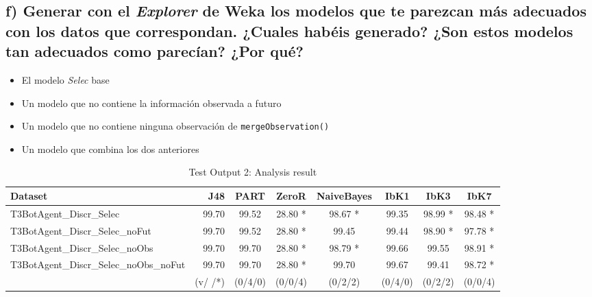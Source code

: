 \documentclass[10pt, spanish, pdftex]{../.memo/plantilla_memorias}
\begin{document}
\subsection{f) Generar con el \textit{Explorer} de Weka los modelos que te parezcan más adecuados con los datos que
correspondan. ¿Cuales habéis generado? ¿Son estos modelos tan adecuados como parecían? ¿Por qué?}
\begin{itemize}
	\item El modelo \textit{Selec} base
	\item Un modelo que no contiene la información observada a futuro
	\item Un modelo que no contiene ninguna observación de \texttt{mergeObservation()}
	\item Un modelo que combina los dos anteriores
\end{itemize}
\begin{table}[h]
	\centering
	\begin{tabular}{l|r|cccccc|}
	\hline
	\multicolumn{1}{|l|}{Dataset}                                & J48     & PART    & ZeroR   & NaiveBayes & IbK1    & IbK3    & IbK7    \\ \hline
	\multicolumn{1}{|l|}{T3BotAgent\_Discr\_Selec}               & 99.70   & 99.52   & 28.80 * & 98.67 *    & 99.35   & 98.99 * & 98.48 * \\
	\multicolumn{1}{|l|}{T3BotAgent\_Discr\_Selec\_noFut}        & 99.70   & 99.52   & 28.80 * & 99.45      & 99.44   & 98.90 * & 97.78 * \\
	\multicolumn{1}{|l|}{T3BotAgent\_Discr\_Selec\_noObs}        & 99.70   & 99.70   & 28.80 * & 98.79 *    & 99.66   & 99.55   & 98.91 * \\
	\multicolumn{1}{|l|}{T3BotAgent\_Discr\_Selec\_noObs\_noFut} & 99.70   & 99.70   & 28.80 * & 99.70      & 99.67   & 99.41   & 98.72 * \\ \hline
	\multicolumn{1}{r|}{}                                        & (v/ /*) & (0/4/0) & (0/0/4) & (0/2/2)    & (0/4/0) & (0/2/2) & (0/0/4) \\ \cline{2-8} 
	\end{tabular}
	\renewcommand{\tablename}{Tabla}
	\caption{Test Output 2: Analysis result}
\end{table}
\end{document}
